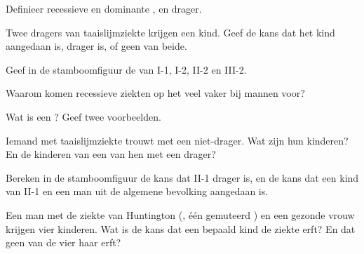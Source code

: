 \begin{exercise}[$\star$]\label{exo:g11:genes-and-disease:1}
Definieer recessieve en dominante , en drager.
\end{exercise}

\begin{exercise}[$\star$]\label{exo:g11:genes-and-disease:2}
Twee dragers van taaislijmziekte krijgen een kind. Geef de kans dat het
kind aangedaan is, drager is, of geen van beide.
\end{exercise}

\begin{exercise}[$\star$]\label{exo:g11:genes-and-disease:3}
Geef in de stamboomfiguur de  van I-1, I-2, II-2 en III-2.
\end{exercise}

\begin{exercise}[$\star$]\label{exo:g11:genes-and-disease:4}
Waarom komen recessieve ziekten op het  veel vaker bij mannen
voor?
\end{exercise}

\begin{exercise}[$\star$]\label{exo:g11:genes-and-disease:5}
Wat is een ? Geef twee voorbeelden.
\end{exercise}

\begin{exercise}[$\star\star$]\label{exo:g11:genes-and-disease:6}
Iemand met taaislijmziekte trouwt met een niet-drager. Wat zijn hun
kinderen? En de kinderen van een van hen met een drager?
\end{exercise}

\begin{exercise}[$\star\star$]\label{exo:g11:genes-and-disease:7}
Bereken in de stamboomfiguur de kans dat II-1 drager is, en de kans dat
een kind van II-1 en een man uit de algemene bevolking aangedaan is.
\end{exercise}

\begin{exercise}[$\star\star$]\label{exo:g11:genes-and-disease:8}
Een man met de ziekte van Huntington (, één gemuteerd ) en
een gezonde vrouw krijgen vier kinderen. Wat is de kans dat een bepaald
kind de ziekte erft? En dat geen van de vier haar erft?
\end{exercise}

